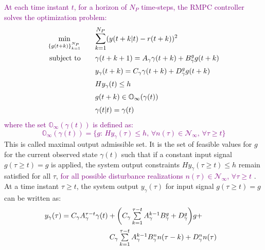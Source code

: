 \documentclass[letterpaper, 10 pt, conference]{ieeeconf}  %
\begin{document}
	\textcolor{purple}{At each time instant $t$, for a horizon of $N_P$ time-steps, the RMPC controller solves the optimization problem:
	\begin{equation}
	\begin{aligned}
	 \underset{\{g(t+k)\}_{k=1}^{N_P}}{\text{min}}
	&  \hspace{20pt} \mathlarger{\sum\limits_{k=1}^{N_P}}(y(t+k|t)-r(t+k))^2 \\
	\text{subject to}
	& \hspace{20pt} \gamma(t+k+1) = A_\gamma\gamma(t+k) + B_\gamma^g g(t+k)\\
	& \hspace{20pt} y_{\gamma}(t+k) = C_\gamma\gamma(t+k) + D_\gamma^g g(t+k)\\
	& \hspace{20pt} Hy_{\gamma}(t) \leq h \\
	& \hspace{20pt}  g(t+k) \in \mathbb{O}_{\infty}(\gamma(t)) \\
	& \hspace{20pt} \gamma(t|t) = \gamma(t)
	\end{aligned}
	\label{RMPC}
	\end{equation}
	where the set $\mathbb{O}_{\infty}(\gamma(t))$ is defined as:
	\begin{equation}
	\mathbb{O}_{\infty}(\gamma(t)) = \{g: \hspace{2pt} Hy_{\gamma}(\tau) \leq h ,\hspace{2pt} \forall n(\tau) \in \mathcal{N}_{\infty} ,\hspace{2pt} \forall \tau \geq t \} 
	\label{O_infty}
	\end{equation}}
	This is called maximal output admissible set.
	It is the set of feasible values for $g$ for the current observed state $\gamma(t)$ such that if a constant input signal $g(\tau \geq t)=g$ is applied, the system output constraints $Hy_{\gamma}(\tau \geq t) \leq h$ remain satisfied for all $\tau$, \textcolor{purple}{for all possible disturbance realizations $n(\tau) \in \mathcal{N}_{\infty}$, $\forall \tau \geq t$ }.
	At a time instant $\tau \geq t$, the system output $y_{\gamma}(\tau)$ for input signal $g(\tau \geq t)=g$ can be written as:
	\begin{equation*}
	\hspace{-30pt}
	\begin{aligned}
	\begin{matrix}
	y_{\gamma}(\tau) = C_{\gamma}A_{\gamma}^{\tau - t}\gamma(t) + \bigg( C_{\gamma}\sum\limits_{k=1}^{\tau - t}A_{\gamma}^{k-1}B^g_{\gamma} + D_{\gamma}^g \bigg)g + \vspace{5pt}\\  \hspace{110pt} C_{\gamma}\sum\limits_{k=1}^{\tau - t}A_{\gamma}^{k-1}B^n_{\gamma}n(\tau-k) + D_{\gamma}^n n(\tau)
	\end{matrix}
	\end{aligned}
	\end{equation*} \\
\end{document}

